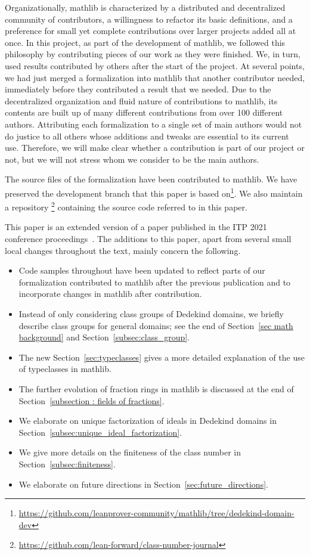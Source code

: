 \documentclass[sn-mathphys]{sn-jnl}%
\newcommand{\mathlib}{\textsf{mathlib}\xspace}
\begin{document}
Organizationally, \mathlib is characterized by a distributed and decentralized community of contributors, a willingness to refactor its basic definitions, and a preference for small yet complete contributions over larger projects added all at once.
In this project, as part of the development of \mathlib, we followed this philosophy by contributing pieces of our work as they were finished.
We, in turn, used results contributed by others after the start of the project.
At several points, we had just merged a formalization into \mathlib that another contributor needed,
immediately before they contributed a result that we needed.
Due to the decentralized organization and fluid nature of contributions to \mathlib, its contents are built up of many different contributions from over 100 different authors.
Attributing each formalization to a single set of main authors would not do justice to all others whose additions and tweaks are essential to its current use. Therefore, we will make clear whether a contribution is part of our project or not, but we will not stress whom we consider to be the main authors.

The source files of the formalization have been contributed to \mathlib.
We have preserved the development branch that this paper is based on\footnote{\url{https://github.com/leanprover-community/mathlib/tree/dedekind-domain-dev}}.
We also maintain a
repository%
\footnote{\url{https://github.com/lean-forward/class-number-journal}}
containing the source code referred to in this paper.

This paper is an extended version of a paper published in the ITP 2021 conference proceedings~\cite{ClassGroupsITP2021}. The additions to this paper, apart from several small local changes throughout the text, mainly concern the following.
\begin{itemize}
 \item Code samples throughout have been updated to reflect parts of our formalization contributed to \mathlib after the previous publication and to incorporate changes in \mathlib after contribution.
 \item Instead of only considering class groups of Dedekind domains, we briefly describe class groups for general domains; see the end of Section~\ref{sec math background} and Section~\ref{subsec:class_group}.
 \item The new Section~\ref{sec:typeclasses} gives a more detailed explanation of the use of typeclasses in \mathlib.
 \item The further evolution of fraction rings in \mathlib is discussed at the end of Section~\ref{subsection : fields of fractions}.
 \item We elaborate on unique factorization of ideals in Dedekind domains in Section~\ref{subsec:unique_ideal_factorization}.
 \item We give more details on the finiteness of the class number in Section~\ref{subsec:finiteness}.
 \item We elaborate on future directions in Section~\ref{sec:future_directions}.
\end{itemize}
\end{document}
